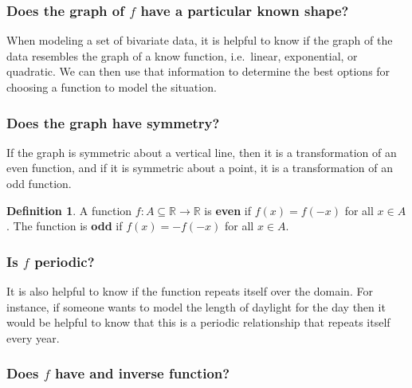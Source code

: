 \documentclass[
]{book}
\theoremstyle{definition}
\newtheorem{definition}{Definition}[chapter]
\theoremstyle{definition}
\theoremstyle{definition}
\theoremstyle{definition}
\theoremstyle{remark}
\begin{document}
\hypertarget{does-the-graph-of-f-have-a-particular-known-shape}{%
\subsubsection*{\texorpdfstring{Does the graph of \(f\) have a particular known shape?}{Does the graph of f have a particular known shape?}}\label{does-the-graph-of-f-have-a-particular-known-shape}}

When modeling a set of bivariate data, it is helpful to know if the graph of the data resembles the graph of a know function, i.e.~linear, exponential, or quadratic. We can then use that information to determine the best options for choosing a function to model the situation.

\hypertarget{does-the-graph-have-symmetry}{%
\subsubsection*{Does the graph have symmetry?}\label{does-the-graph-have-symmetry}}

If the graph is symmetric about a vertical line, then it is a transformation of an even function, and if it is symmetric about a point, it is a transformation of an odd function.

\begin{definition}
A function \(f:A\subseteq \mathbb{R}\rightarrow \mathbb{R}\) is \textbf{even} if \(f(x)=f(-x)\) for all \(x\in A\). The function is \textbf{odd} if \(f(x)=-f(-x)\) for all \(x\in A\).
\end{definition}

\hypertarget{is-f-periodic}{%
\subsubsection*{\texorpdfstring{Is \(f\) periodic?}{Is f periodic?}}\label{is-f-periodic}}

It is also helpful to know if the function repeats itself over the domain. For instance, if someone wants to model the length of daylight for the day then it would be helpful to know that this is a periodic relationship that repeats itself every year.

\hypertarget{does-f-have-and-inverse-function}{%
\subsubsection*{\texorpdfstring{Does \(f\) have and inverse function?}{Does f have and inverse function?}}\label{does-f-have-and-inverse-function}}
\end{document}
